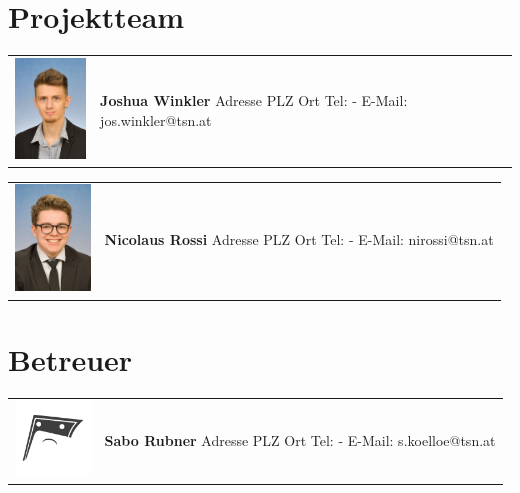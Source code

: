 \section*{Projektteam}

\begin{tabular}[t]{p{2cm} p{5cm}}
    \vspace{0pt}
    \includegraphics[width=2cm]{../images/joshua.jpg}
    &
    \vspace{0pt}
    \textbf{Joshua Winkler} 
    \newline Adresse
    \newline PLZ Ort
    \newline
    \newline Tel: -
    \newline E-Mail: jos.winkler@tsn.at
    \\
\end{tabular}

\begin{tabular}[t]{p{2cm} p{5cm}}
    \vspace{0pt}
    \includegraphics[width=2cm]{../images/nicolaus.jpg}
    &
    \vspace{0pt}
    \textbf{Nicolaus Rossi}
    \newline Adresse
    \newline PLZ Ort
    \newline
    \newline Tel: -
    \newline E-Mail: nirossi@tsn.at
    \\
\end{tabular}

\section*{Betreuer}

\begin{tabular}[t]{p{2cm} p{5cm}}
    \vspace{0pt}
    \includegraphics[width=2cm]{../images/sadsokka.png}
    &
    \vspace{0pt}
    \textbf{Sabo Rubner}
    \newline Adresse
    \newline PLZ Ort
    \newline
    \newline Tel: -
    \newline E-Mail: s.koelloe@tsn.at
    \\
\end{tabular}

\newpage